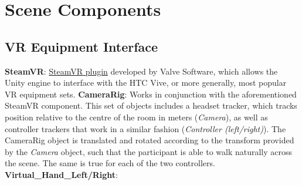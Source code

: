 \documentclass{article}
\begin{document}
\section{Scene Components}
\subsection{VR Equipment Interface} %
\textbf{SteamVR}: \href{https://bit.ly/2VnzLbI}{SteamVR plugin} developed by Valve Software, which allows the Unity engine to interface with the HTC Vive, or more generally, most popular VR equipment sets. \newline \newline
\textbf{CameraRig}: Works in conjunction with the aforementioned SteamVR component. This set of objects includes a headset tracker, which tracks position relative to the centre of the room in meters (\textit{Camera}), as well as controller trackers that work in a similar fashion (\textit{Controller (left\slash right)}). The CameraRig object is translated and rotated according to the transform provided by the \textit{Camera} object, such that the participant is able to walk naturally across the scene. The same is true for each of the two controllers. \newline \newline
\textbf{Virtual_Hand_Left\slash Right}: \newline \newline
\end{document}
